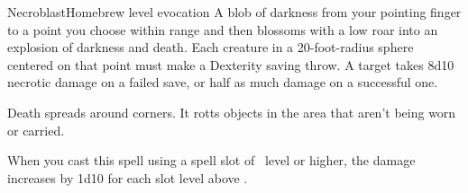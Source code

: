\begin{spell}{Necroblast}{Homebrew}{ level evocation}
{
}
A blob of darkness from your pointing finger to a point you
choose within range and then blossoms with a low roar into
an explosion of darkness and death. Each creature
in a 20-foot-radius sphere centered on that point must
make a Dexterity saving throw. A target takes 8d10
necrotic damage on a failed save, or half as much damage on a
successful one.

Death spreads around corners. It rotts objects in the area that
aren’t being worn or carried.

 When you cast this spell using a
spell slot of ~level or higher, the damage increases by
1d10 for each slot level above .
\end{spell}
